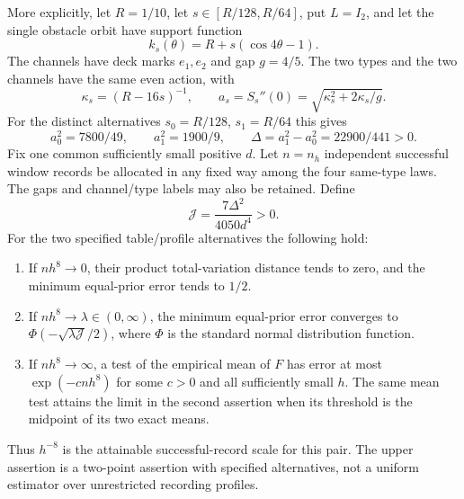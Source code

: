 \begin{theorem}
More explicitly, let $R=1/10$, let $s\in[R/128,R/64]$, put $L=I_2$, and
let the single obstacle orbit have support function
\begin{equation}\label{eq:v53-table-family}
 k_s(\theta)=R+s(\cos4\theta-1).
\end{equation}
The channels have deck marks $e_1,e_2$ and gap $g=4/5$.  The two types
and the two channels have the same even action, with
\begin{equation}\label{eq:v53-actual-quadratic}
 \kappa_s=(R-16s)^{-1},\qquad
 a_s=S_s''(0)=\sqrt{\kappa_s^2+2\kappa_s/g}.
\end{equation}
For the distinct alternatives $s_0=R/128$, $s_1=R/64$ this gives
\[
 a_0^2=7800/49,\qquad a_1^2=1900/9,\qquad
 \Delta=a_1^2-a_0^2=22900/441>0.
\]
Fix one common sufficiently small positive $d$.  Let $n=n_h$ independent
successful window records be allocated in any fixed way among the four
same-type laws.  The gaps and channel/type labels may also be retained.
Define
\begin{equation}\label{eq:v53-J}
             \mathcal J=\frac{7\Delta^2}{4050d^4}>0.
\end{equation}
For the two specified table/profile alternatives the following hold:
\begin{enumerate}
\item If $nh^8\to0$, their product total-variation distance tends to zero,
and the minimum equal-prior error tends to $1/2$.
\item If $nh^8\to\lambda\in(0,\infty)$, the minimum equal-prior error
converges to $\Phi(-\sqrt{\lambda\mathcal J}/2)$, where $\Phi$ is the
standard normal distribution function.
\item If $nh^8\to\infty$, a test of the empirical mean of $F$ has error
at most $\exp(-cnh^8)$ for some $c>0$ and all sufficiently small $h$.
The same mean test attains the limit in the second assertion when its
threshold is the midpoint of its two exact means.
\end{enumerate}
Thus $h^{-8}$ is the attainable successful-record scale for this pair.
The upper assertion is a two-point assertion with specified alternatives,
not a uniform estimator over unrestricted recording profiles.
\end{theorem}

